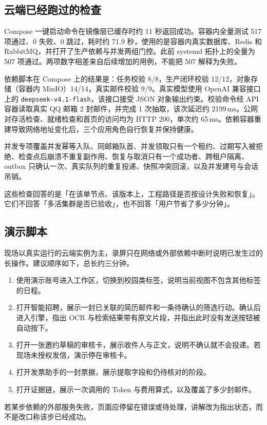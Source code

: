 \documentclass[UTF8,a4paper,zihao=5,fontset=fandol]{ctexart}
\begin{document}
\subsection{云端已经跑过的检查}
Compose 一键启动命令在镜像层已缓存时约 11 秒返回成功。容器内全量测试 517 项通过、0 失败、0 跳过，耗时约 71.9 秒，使用的是容器内真实数据库、Redis 和 RabbitMQ，并打开了生产依赖与并发两组门控。此前 systemd 拓扑上的全量为 507 项通过。两项数字相差来自后续增加的用例，不能把 507 解释为失败。

依赖脚本在 Compose 上的结果是：任务校验 8/8，生产闭环校验 12/12，对象存储（容器内 MinIO）14/14，真实邮件校验 9/9。真实模型使用 OpenAI 兼容接口上的 \texttt{deepseek-v4.1-flash}，该接口接受 JSON 对象输出约束。校验命令经 API 容器读取真实 QQ 邮箱 2 封邮件，并完成 1 次抽取，该次延迟约 2199\,ms。公网对存活检查、就绪检查和首页的访问均为 HTTP 200，单次约 65\,ms。依赖容器重建导致网络地址变化后，三个应用角色自行恢复并保持健康。

并发专项覆盖并发幂等入队、同邮箱队首、并发领取只有一个租约、过期写入被拒绝、检查点后崩溃不重复副作用、恢复与取消只有一个成功者、跨租户隔离、outbox 只确认一次、真实队列的重复投递、快照冲突回滚，以及并发建号与会话吊销。

这些检查回答的是「在该单节点、该版本上，工程路径是否按设计失败和恢复」。它们不回答「多活集群是否已验收」，也不回答「用户节省了多少分钟」。

\subsection{演示脚本}
现场以真实运行的云端实例为主，录屏只在网络或外部依赖中断时说明已发生过的长操作。建议顺序如下，总长约三分钟。

\begin{enumerate}
\item 使用演示账号进入工作区，切换到校园类标签，说明当前视图不包含其他标签的日程。
\item 打开智能招聘，展示一封已关联的简历邮件和一条待确认的筛选行动。确认后进入引擎，指出 OCR 与检索结果带有原文片段，并指出此时没有发送按钮被自动按下。
\item 打开一张邀约草稿的审核卡，展示收件人与正文，说明不确认就不会投递。若现场未授权发信，演示停在审核卡。
\item 打开发票助手的一封票据，展示提取字段和仍待核对的阶段。
\item 打开证据链，展示一次调用的 Token 与费用算式，以及覆盖了多少封邮件。
\end{enumerate}

若某步依赖的外部服务失败，页面应停留在错误或待处理，讲解改为指出状态，而不是改口称该步已经成功。
\end{document}
